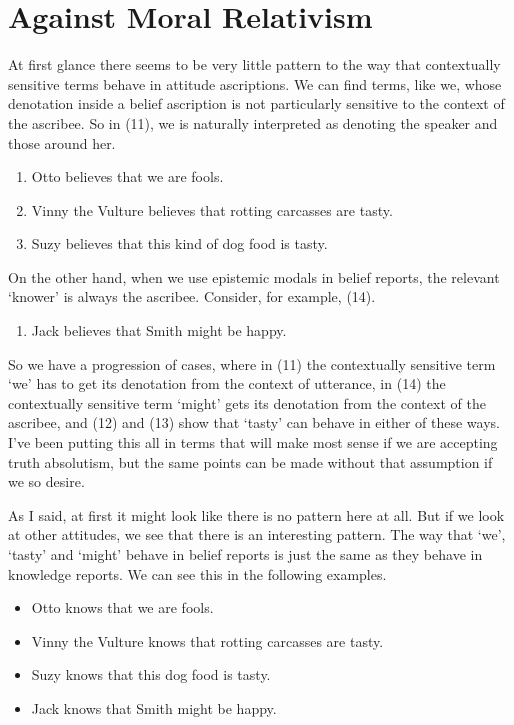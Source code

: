\documentclass[
  11pt,
  letterpaper,
  DIV=11,
  numbers=noendperiod,
  twoside]{scrartcl}
\providecommand{\tightlist}{%
  \setlength{\itemsep}{0pt}\setlength{\parskip}{0pt}}
\begin{document}
\section{Against Moral Relativism}\label{against-moral-relativism}

At first glance there seems to be very little pattern to the way that
contextually sensitive terms behave in attitude ascriptions. We can find
terms, like we, whose denotation inside a belief ascription is not
particularly sensitive to the context of the ascribee. So in (11), we is
naturally interpreted as denoting the speaker and those around her.

\begin{enumerate}
\def\labelenumi{\arabic{enumi}.}
\setcounter{enumi}{10}
\tightlist
\item
  Otto believes that we are fools.
\item
  Vinny the Vulture believes that rotting carcasses are tasty.
\item
  Suzy believes that this kind of dog food is tasty.
\end{enumerate}

On the other hand, when we use epistemic modals in belief reports, the
relevant `knower' is always the ascribee. Consider, for example, (14).

\begin{enumerate}
\def\labelenumi{\arabic{enumi}.}
\setcounter{enumi}{13}
\tightlist
\item
  Jack believes that Smith might be happy.
\end{enumerate}

So we have a progression of cases, where in (11) the contextually
sensitive term `we' has to get its denotation from the context of
utterance, in (14) the contextually sensitive term `might' gets its
denotation from the context of the ascribee, and (12) and (13) show that
`tasty' can behave in either of these ways. I've been putting this all
in terms that will make most sense if we are accepting truth absolutism,
but the same points can be made without that assumption if we so desire.

As I said, at first it might look like there is no pattern here at all.
But if we look at other attitudes, we see that there is an interesting
pattern. The way that `we', `tasty' and `might' behave in belief reports
is just the same as they behave in knowledge reports. We can see this in
the following examples.

\begin{itemize}
\tightlist
\item
  Otto knows that we are fools.
\item
  Vinny the Vulture knows that rotting carcasses are tasty.
\item
  Suzy knows that this dog food is tasty.
\item
  Jack knows that Smith might be happy.
\end{itemize}
\end{document}

